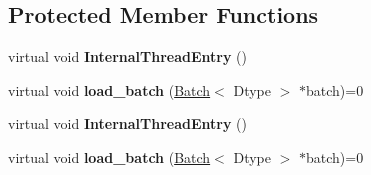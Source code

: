\subsection*{Protected Member Functions}
\begin{DoxyCompactItemize}
\item 
\mbox{\label{classcaffe_1_1_base_prefetching_data_layer_aa2740717d51bd0b01646ace302991838}} 
virtual void {\bfseries Internal\+Thread\+Entry} ()
\item 
\mbox{\label{classcaffe_1_1_base_prefetching_data_layer_adab5b2e3013120a767d2be6ba609f045}} 
virtual void {\bfseries load\+\_\+batch} (\mbox{\hyperlink{classcaffe_1_1_batch}{Batch}}$<$ Dtype $>$ $\ast$batch)=0
\item 
\mbox{\label{classcaffe_1_1_base_prefetching_data_layer_a586fac095f9bdc8e049e9166e1e98376}} 
virtual void {\bfseries Internal\+Thread\+Entry} ()
\item 
\mbox{\label{classcaffe_1_1_base_prefetching_data_layer_adab5b2e3013120a767d2be6ba609f045}} 
virtual void {\bfseries load\+\_\+batch} (\mbox{\hyperlink{classcaffe_1_1_batch}{Batch}}$<$ Dtype $>$ $\ast$batch)=0
\end{DoxyCompactItemize}
